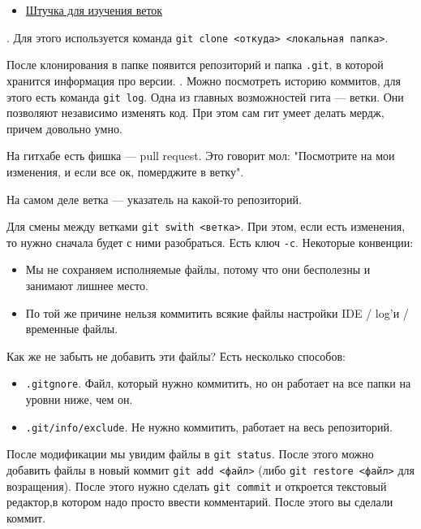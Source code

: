 \begin{itemize}
\item \href{https://learngitbranching.js.org/}{Штучка для изучения веток}
\end{itemize}
.
Для этого используется команда \texttt{git clone <откуда> <локальная папка>}.

После клонирования в папке появится репозиторий и папка \texttt{.git}, в которой хранится информация про версии.
.
Можно посмотреть историю коммитов, для этого есть команда \texttt{git log}.
Одна из главных возможностей гита --- ветки. Они позволяют независимо изменять код. При этом сам гит умеет делать мердж, причем довольно умно. 

На гитхабе есть фишка --- pull request. Это говорит мол: "Посмотрите на мои изменения, и если все ок, померджите в ветку". 

На самом деле ветка --- указатель на какой-то репозиторий. 

Для смены между ветками \texttt{git swith <ветка>}. При этом, если есть изменения, то нужно сначала будет с ними разобраться. Есть ключ \texttt{-c}.
Некоторые конвенции:
\begin{itemize}
    \item Мы не сохраняем исполняемые файлы, потому что они бесполезны и занимают лишнее место.
    \item По той же причине нельзя коммитить всякие файлы настройки IDE / log'и / временные файлы.
\end{itemize}

Как же не забыть не добавить эти файлы? Есть несколько способов:
\begin{itemize}
    \item \texttt{.gitgnore}. Файл, который нужно коммитить, но он работает на все папки на уровни ниже, чем он.
    \item \texttt{.git/info/exclude}. Не нужно коммитить, работает на весь репозиторий. 
\end{itemize}

После модификации мы увидим файлы в \texttt{git status}. После этого можно добавить файлы в новый коммит \texttt{git add <файл>} (либо \texttt{git restore <файл>} для возращения). После этого нужно сделать \texttt{git commit} и откроется текстовый редактор,в котором надо просто ввести комментарий. После этого вы сделали коммит.

